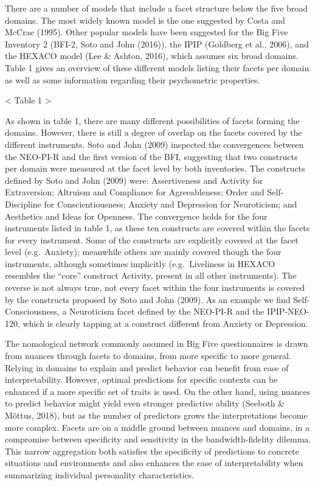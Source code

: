 \documentclass[man]{apa6}
\theoremstyle{definition}
\theoremstyle{definition}
\theoremstyle{definition}
\theoremstyle{remark}
\begin{document}
There are a number of models that include a facet structure below the
five broad domains. The most widely known model is the one suggested by
Costa and McCrae (1995). Other popular models have been suggested for
the Big Five Inventory 2 (BFI-2, Soto and John (2016)), the IPIP
(Goldberg et al., 2006), and the HEXACO model (Lee \& Ashton, 2016),
which assumes six broad domains. Table 1 gives an overview of these
different models listing their facets per domain as well as some
information regarding their psychometric properties.

\textless{} Table 1 \textgreater{}

As shown in table 1, there are many different possibilities of facets
forming the domains. However, there is still a degree of overlap on the
facets covered by the different instruments. Soto and John (2009)
inspected the convergences between the NEO-PI-R and the first version of
the BFI, suggesting that two constructs per domain were measured at the
facet level by both inventories. The constructs defined by Soto and John
(2009) were: Assertiveness and Activity for Extraversion; Altruism and
Compliance for Agreeableness; Order and Self-Discipline for
Conscientiousness; Anxiety and Depression for Neuroticism; and
Aesthetics and Ideas for Openness. The convergence holds for the four
instruments listed in table 1, as these ten constructs are covered
within the facets for every instrument. Some of the constructs are
explicitly covered at the facet level (e.g.~Anxiety); meanwhile others
are mainly covered though the four instruments, although sometimes
implicitly (e.g.~Liveliness in HEXACO resembles the \enquote{core}
construct Activity, present in all other instruments). The reverse is
not always true, not every facet within the four instruments is covered
by the constructs proposed by Soto and John (2009). As an example we
find Self-Consciousness, a Neuroticism facet defined by the NEO-PI-R and
the IPIP-NEO-120, which is clearly tapping at a construct different from
Anxiety or Depression.

The nomological network commonly assumed in Big Five questionnaires is
drawn from nuances through facets to domains, from more specific to more
general. Relying in domains to explain and predict behavior can benefit
from ease of interpretability. However, optimal predictions for specific
contexts can be enhanced if a more specific set of traits is used. On
the other hand, using nuances to predict behavior might yield even
stronger predictive ability (Seeboth \& Mõttus, 2018), but as the number
of predictors grows the interpretations become more complex. Facets are
on a middle ground between nuances and domains, in a compromise between
specificity and sensitivity in the bandwidth-fidelity dilemma. This
narrow aggregation both satisfies the specificity of predictions to
concrete situations and environments and also enhances the ease of
interpretability when summarizing individual personality
characteristics.
\end{document}
